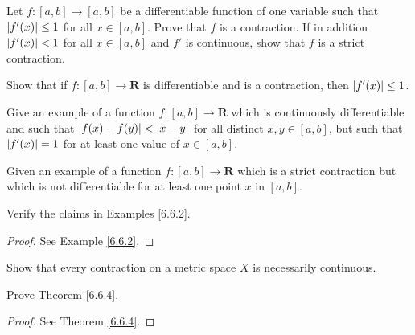 \exercisesection

\begin{exercise}\label{ex 6.6.1}
    Let \(f : [a, b] \to [a, b]\) be a differentiable function of one variable such that \(\abs*{f'(x)} \leq 1\) for all \(x \in [a, b]\).
    Prove that \(f\) is a contraction.
    If in addition \(\abs*{f'(x)} < 1\) for all \(x \in [a, b]\) and \(f'\) is continuous, show that \(f\) is a strict contraction.
\end{exercise}

\begin{exercise}\label{ex 6.6.2}
    Show that if \(f : [a, b] \to \mathbf{R}\) is differentiable and is a contraction, then \(\abs*{f'(x)} \leq 1\).
\end{exercise}

\begin{exercise}\label{ex 6.6.3}
    Give an example of a function \(f : [a, b] \to \mathbf{R}\) which is continuously differentiable and such that \(\abs*{f(x) - f(y)} < \abs*{x - y}\) for all distinct \(x, y \in [a, b]\), but such that \(\abs*{f'(x)} = 1\) for at least one value of \(x \in [a, b]\).
\end{exercise}

\begin{exercise}\label{ex 6.6.4}
    Given an example of a function \(f : [a, b] \to \mathbf{R}\) which is a strict contraction but which is not differentiable for at least one point \(x\) in \([a, b]\).
\end{exercise}

\begin{exercise}\label{ex 6.6.5}
    Verify the claims in Examples \ref{6.6.2}.
\end{exercise}

\begin{proof}
    See Example \ref{6.6.2}.
\end{proof}

\begin{exercise}\label{ex 6.6.6}
    Show that every contraction on a metric space \(X\) is necessarily continuous.
\end{exercise}

\begin{exercise}\label{ex 6.6.7}
    Prove Theorem \ref{6.6.4}.
\end{exercise}

\begin{proof}
    See Theorem \ref{6.6.4}.
\end{proof}

